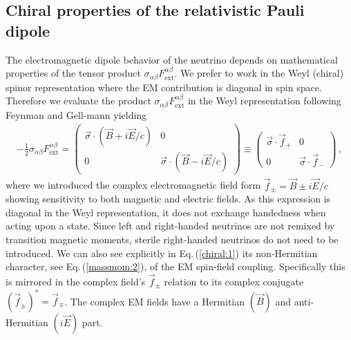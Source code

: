 \documentclass{ws-ijmpa}
\newcommand{\req}[1]{Eq.\,(\ref{#1})}
\begin{document}
\subsection{Chiral properties of the relativistic Pauli dipole}
\label{sec:numoment}
The electromagnetic dipole behavior of the neutrino depends on mathematical properties of the tensor product $\sigma_{\alpha\beta}F^{\alpha\beta}_\mathrm{ext}$. We prefer to work in the Weyl (chiral) spinor representation where the EM contribution is diagonal in spin space. Therefore we evaluate the product $\sigma_{\alpha\beta}F^{\alpha\beta}_\mathrm{ext}$ in the Weyl representation following Feynman and Gell-mann\cite{Feynman:1958ty} yielding
\begin{align}
\label{chiral:1}
-\frac{1}{2}\sigma_{\alpha\beta}F^{\alpha\beta}_\mathrm{ext}=
\begin{pmatrix}
\vec{\sigma}\cdot(\vec{B}+i\vec{E}/c) & 0\\
0 & \vec{\sigma}\cdot(\vec{B}-i\vec{E}/c)
\end{pmatrix}\equiv
\begin{pmatrix}
\vec{\sigma}\cdot\vec{f}_{+} & 0 \\
0 & \vec{\sigma}\cdot\vec{f}_{-}
\end{pmatrix}\,,
\end{align}
where we introduced the complex electromagnetic field form $\vec{f}_{\pm}=\vec{B}\pm i\vec{E}/c$ showing sensitivity to both magnetic and electric fields. As this expression is diagonal in the Weyl representation, it does not exchange handedness when acting upon a state. Since left and right-handed neutrinos are not remixed by transition magnetic moments, sterile right-handed neutrinos do not need to be introduced. We can also see explicitly in \req{chiral:1} its non-Hermitian character, see \req{massmom:2}, of the EM spin-field coupling. Specifically this is mirrored in the complex field's $\vec{f}_{\pm}$ relation to its complex conjugate $(\vec{f}_{\pm})^{*}=\vec{f}_{\mp}$. The complex EM fields have a Hermitian $(\vec{B})$ and anti-Hermitian $(i\vec{E})$ part.
\end{document}
